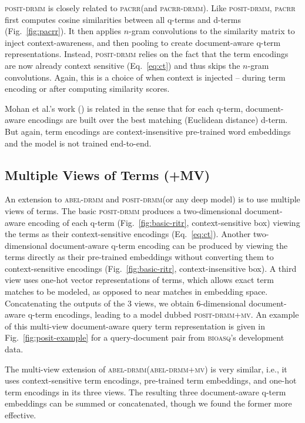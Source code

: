 \documentclass[11pt,a4paper]{article}
\newcommand{\bioasq}{\textsc{bioasq}\xspace}
\newcommand{\pacrr}{\textsc{pacrr}\xspace}
\newcommand{\pacrrdrmm}{\textsc{pacrr-drmm}\xspace}
\newcommand{\abeldrmm}{\textsc{abel-drmm}\xspace}
\newcommand{\abeldrmmmv}{\textsc{abel-drmm+mv}\xspace}
\newcommand{\positdrmm}{\textsc{posit-drmm}\xspace}
\newcommand{\positdrmmmv}{\textsc{posit-drmm+mv}\xspace}
\begin{document}
\positdrmm is closely related to \pacrr (and \pacrrdrmm). Like \positdrmm, \pacrr first computes cosine similarities between all q-terms and d-terms (Fig.~\ref{fig:pacrr}). It then applies $n$-gram convolutions to the similarity matrix to inject context-awareness, and then pooling to create document-aware q-term representations. Instead, \positdrmm relies on the fact that the term encodings are now already context sensitive (Eq.~\ref{eq:ct}) and thus skips the $n$-gram convolutions. Again, this is a choice of when context is injected -- during term encoding or after computing similarity scores. 

Mohan et al.'s work (\citeyear{mohan2017deep}) is related in the sense that for each q-term, document-aware encodings are built over the best matching (Euclidean distance) d-term. But again, term encodings are context-insensitive pre-trained word embeddings and the model is not trained end-to-end.



\subsection{Multiple Views of Terms (+MV)}
\label{sec:multiview}

An extension to \abeldrmm and \positdrmm (or any deep model) is to use multiple views of terms. The basic \positdrmm produces a two-dimensional document-aware encoding of each q-term (Fig.~\ref{fig:basic-ritr}, context-sensitive box) viewing the terms as their context-sensitive encodings (Eq.~\ref{eq:ct}). Another two-dimensional document-aware q-term encoding can be produced by viewing the terms directly as their pre-trained  embeddings without converting them to context-sensitive encodings (Fig.~\ref{fig:basic-ritr}, context-insensitive box). A third view uses one-hot vector representations of terms, which allows exact term matches to be modeled, as opposed to near matches in embedding space.
Concatenating the outputs of the 3 views, we obtain 6-dimensional document-aware q-term encodings, leading to a model dubbed \positdrmmmv. An example of this multi-view document-aware query term representation is given in Fig.~\ref{fig:posit-example} for a query-document pair from \bioasq's development data.

The multi-view extension of \abeldrmm (\abeldrmmmv) is very similar, i.e., it uses context-sensitive term encodings, pre-trained term embeddings, and one-hot term encodings in its three views. The resulting three document-aware q-term embeddings can be summed or concatenated, though we found the former more effective. 
\end{document}
